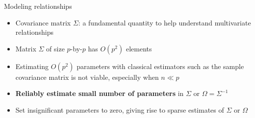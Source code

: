 \documentclass[xcolor=dvipsnames,aspectratio=1610]{beamer}
\theoremstyle{remark}
\begin{document}
\begin{frame}{Modeling relationships}
  \begin{itemize}
    \setlength{\itemsep}{10pt}
    \item Covariance matrix $\Sigma$: a fundamental quantity to help understand 
     multivariate relationships
  \item Matrix $\Sigma$ of size $p$-by-$p$ has $O(p^2)$
    elements
  \item Estimating $O(p^2)$ parameters with classical estimators such as the 
  sample covariance matrix is not viable, especially when $n\ll p$ 
   \item {\bf Reliably estimate small number of parameters} in $\Sigma$ or $\Omega = \Sigma^{-1}$ 
  \item Set insignificant parameters to zero, giving rise to sparse estimates of $\Sigma$ or $\Omega$ 
  \end{itemize}
\end{frame}
\end{document}
